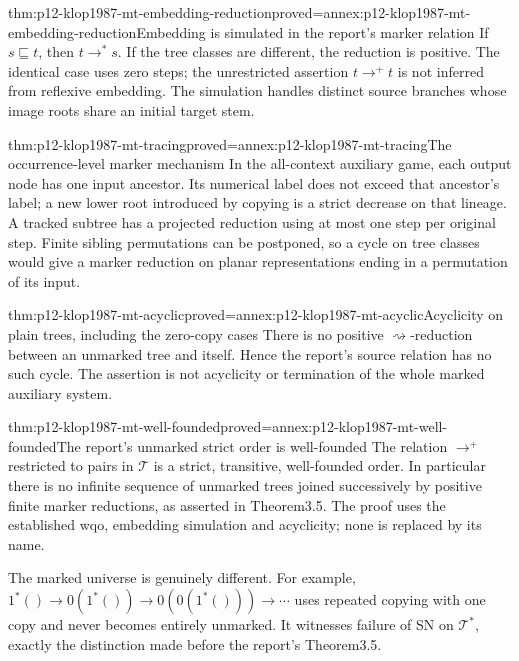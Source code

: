 \begin{hblemma}{thm:p12-klop1987-mt-embedding-reduction}{proved=annex:p12-klop1987-mt-embedding-reduction}{Embedding is simulated in the report's marker relation}
If \(s\sqsubseteq t\), then \(t\to^*s\). If the tree classes
are different, the reduction is positive. The identical case uses
zero steps; the unrestricted assertion \(t\to^+t\) is not inferred
from reflexive embedding. The simulation handles distinct source
branches whose image roots share an initial target stem.
\end{hblemma}

\begin{hblemma}{thm:p12-klop1987-mt-tracing}{proved=annex:p12-klop1987-mt-tracing}{The occurrence-level marker mechanism}
In the all-context auxiliary game, each output node has one input
ancestor. Its numerical label does not exceed that ancestor's label;
a new lower root introduced by copying is a strict decrease on that
lineage. A tracked subtree has a projected reduction using at most
one step per original step. Finite sibling permutations can be
postponed, so a cycle on tree classes would give a marker reduction
on planar representations ending in a permutation of its input.
\end{hblemma}

\begin{hbtheorem}{thm:p12-klop1987-mt-acyclic}{proved=annex:p12-klop1987-mt-acyclic}{Acyclicity on plain trees, including the zero-copy cases}
There is no positive \(\rightsquigarrow\)-reduction between an
unmarked tree and itself. Hence the report's source relation has
no such cycle. The assertion is not acyclicity or termination of
the whole marked auxiliary system.
\end{hbtheorem}

\begin{hbtheorem}{thm:p12-klop1987-mt-well-founded}{proved=annex:p12-klop1987-mt-well-founded}{The report's unmarked strict order is well-founded}
The relation \(\to^+\) restricted to pairs in \(\mathcal T\)
is a strict, transitive, well-founded order. In particular there is
no infinite sequence of unmarked trees joined successively by
positive finite marker reductions, as asserted in Theorem3.5.
The proof uses the established wqo, embedding simulation and
acyclicity; none is replaced by its name.
\end{hbtheorem}

The marked universe is genuinely different. For example,
\(1^*()\to0(1^*())\to0(0(1^*()))\to\cdots\)
uses repeated copying with one copy and never becomes entirely
unmarked. It witnesses failure of SN on \(\mathcal T^*\), exactly
the distinction made before the report's Theorem3.5.

